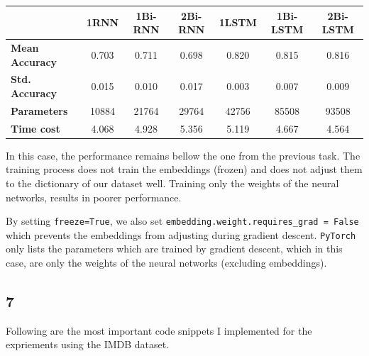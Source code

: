 \documentclass[8pt,a4paper]{report}%
\begin{document}
\begin{table}[H]
\begin{tabular}{|l|c|c|c|c|c|c|}
\hline
\multicolumn{1}{|c|}{\textbf{}} & \textbf{1RNN} & \textbf{1Bi-RNN} & \textbf{2Bi-RNN} & \textbf{1LSTM} & \textbf{1Bi-LSTM} & \textbf{2Bi-LSTM} \\ \hline
\textbf{Mean Accuracy}          & 0.703         & 0.711            & 0.698            & 0.820          & 0.815             & 0.816             \\ \hline
\textbf{Std. Accuracy}          & 0.015         & 0.010            & 0.017            & 0.003          & 0.007             & 0.009             \\ \hline
\textbf{Parameters}             & 10884         & 21764            & 29764            & 42756          & 85508             & 93508             \\ \hline
\textbf{Time cost}              & 4.068         & 4.928            & 5.356            & 5.119          & 4.667             & 4.564             \\ \hline
\end{tabular}
\end{table}

In this case, the performance remains bellow the one from the previous task. The training process does not train the embeddings (frozen) and does not adjust them to the dictionary of our dataset well. Training only the weights of the neural networks, results in poorer performance.

By setting \lstinline{freeze=True}, we also set \lstinline{embedding.weight.requires_grad = False} which prevents the embeddings from adjusting during gradient descent. \lstinline{PyTorch} only lists the parameters which are trained by gradient descent, which in this case, are only the weights of the neural networks (excluding embeddings).


\subsection*{7}

Following are the most important code snippets I implemented for the expriements using the IMDB dataset.
\end{document}

